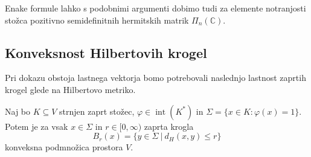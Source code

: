 \documentclass[mat2, tisk]{fmfdelo}
\newcommand{\C}{\mathbb{C}}
\begin{document}
Enake formule lahko s podobnimi argumenti dobimo tudi za elemente
notranjosti stožca pozitivno semidefinitnih hermitskih matrik
$\Pi_n(\C)$.







\subsection{Konveksnost Hilbertovih krogel}

Pri dokazu obstoja lastnega vektorja bomo potrebovali naslednjo lastnost
zaprtih krogel glede na Hilbertovo metriko.

\begin{lema}\label{lema:konveksnost_hilbertovih_krogel}
Naj bo $K\subseteq V$ strnjen zaprt stožec,
$\varphi\in\operatorname{int}(K^*)$ in
$\Sigma=\{x\in K:\varphi(x)=1\}$.
Potem je za vsak $x\in\Sigma$ in
$r\in[0,\infty)$ zaprta krogla
\[
B_r(x)=\{y\in\Sigma ~|~ d_H(x,y)\leq r\}
\]
konveksna podmnožica prostora $V$.
\end{lema}
\end{document}
